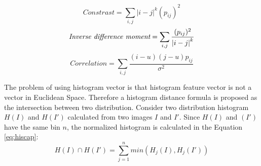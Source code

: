 \documentclass{article}
\begin{document}
\begin{itemize}
\begin{multicols}{2}
\begin{equation}
			\end{equation}\break
			\begin{equation}
				Constrast = \sum_{i, j} {|i - j|}^k (p_{ij})^2
				\label{eq:idm}
			\end{equation}\break
			\begin{equation}
				\textit{\text{Inverse difference moment}} = \sum_{i, j} \frac{(p_{ij})^2}{{|i - j|}^k}
				\label{eq:constrast}
			\end{equation}\break
			\begin{equation}
				Correlation = \sum_{i, j} \frac{(i -u)(j - u)p_{ij}}{\sigma^2}
				\label{eq:correlation}
			\end{equation}\break
		\end{multicols}
	\end{itemize}
	The problem of using histogram vector is that histogram feature vector is not a vector in Euclidean Space. Therefore a histogram distance formula is proposed as the intersection between two distribution. Consider two distribution histogram $H(I)$ and $H(I\prime)$ calculated from two images $I$ and $I\prime$. Since $H(I)$ and $(I\prime)$ have the same bin $n$, the normalized histogram is calculated in the Equation \ref{eq:hiscap}:
	\begin{equation}
		H(I) \cap H(I\prime) = \sum_{j = 1}^{n}min(H_j(I), H_j(I\prime))
		\label{eq:hiscap}
	\end{equation}
\end{document}
